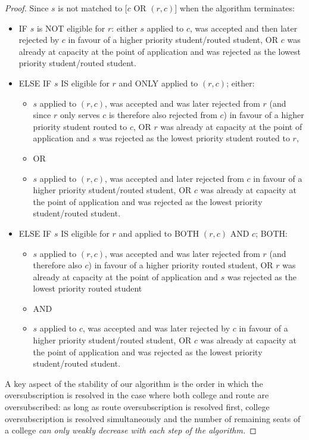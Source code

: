 \documentclass[runningheads]{llncs}
\begin{document}
\begin{proof}
    Since $s$ is not matched to [$c$ OR $(r,c)$] when the algorithm terminates:
    \begin{itemize}
        \item IF $s$ is NOT eligible for $r$: either $s$ applied to $c$, was accepted and then later rejected by $c$ in favour of a higher priority student/routed student, OR $c$ was already at capacity at the point of application and was rejected as the lowest priority student/routed student.
        \item ELSE IF $s$ IS eligible for $r$ and ONLY applied to $(r,c)$; either:
        \begin{itemize}
            \item $s$ applied to $(r,c)$, was accepted and was later rejected from $r$ (and since $r$ only serves $c$ is therefore also rejected from $c$) in favour of a higher priority student routed to $c$, OR $r$ was already at capacity at the point of application and $s$ was rejected as the lowest priority student routed to $r$,
            \item OR
            \item $s$ applied to $(r,c)$, was accepted and later rejected from $c$ in favour of a higher priority student/routed student, OR $c$ was already at capacity at the point of application and was rejected as the lowest priority student/routed student.
        \end{itemize}
        \item ELSE IF $s$ IS eligible for $r$ and applied to BOTH $(r,c)$ AND $c$; BOTH:
        \begin{itemize}
            \item $s$ applied to $(r,c)$, was accepted and was later rejected from $r$ (and therefore also $c$) in favour of a higher priority routed student, OR $r$ was already at capacity at the point of application and $s$ was rejected as the lowest priority routed student
            \item AND
            \item $s$ applied to $c$, was accepted and was later rejected by $c$ in favour of a higher priority student/routed student, OR $c$ was already at capacity at the point of application and was rejected as the lowest priority student/routed student.
        \end{itemize}
    \end{itemize}

    A key aspect of the stability of our algorithm is the order in which the oversubscription is resolved in the case where both college and route are oversubscribed: as long as route oversubscription is resolved first, college oversubscription is resolved simultaneously and the number of remaining seats of a college \textit{can only weakly decrease with each step of the algorithm.}


\end{proof}
\end{document}
